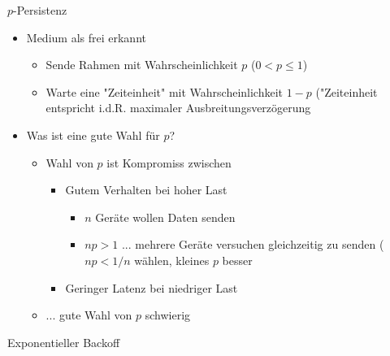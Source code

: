       $p$-Persistenz
      \begin{itemize}
        \item Medium als frei erkannt
          \begin{itemize}
            \item Sende Rahmen mit Wahrscheinlichkeit $p$ ($0<p\le1$)
            \item Warte eine "Zeiteinheit" mit Wahrscheinlichkeit $1-p$ ("Zeiteinheit entspricht i.d.R.
              maximaler Ausbreitungsverzögerung
          \end{itemize}
        \item Was ist eine gute Wahl für $p$?
          \begin{itemize}
            \item Wahl von $p$ ist Kompromiss zwischen
              \begin{itemize}
                \item Gutem Verhalten bei hoher Last
                  \begin{itemize}
                    \item $n$ Geräte wollen Daten senden
                    \item $np>1$ ... mehrere Geräte versuchen gleichzeitig zu senden ($np<1/n$ wählen,
                      kleines $p$ besser
                  \end{itemize}
                \item Geringer Latenz bei niedriger Last
              \end{itemize}
            \item ... gute Wahl von $p$ schwierig
          \end{itemize}
      \end{itemize}
      Exponentieller Backoff
